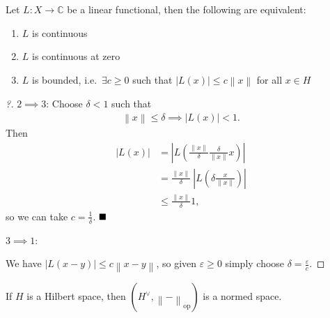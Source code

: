 \begin{theorem}

Let \(L:X \to {\mathbb{C}}\) be a linear functional, then the following
are equivalent:

\begin{enumerate}
\def\labelenumi{\arabic{enumi}.}
\tightlist
\item
  \(L\) is continuous
\item
  \(L\) is continuous at zero
\item
  \(L\) is bounded, i.e.~\(\exists c\geq 0\) such that
  \({\left\lvert {L(x)} \right\rvert} \leq c {\left\lVert {x} \right\rVert}\)
  for all \(x\in H\)
\end{enumerate}

\end{theorem}

\begin{proof}[?]

\(2 \implies 3\): Choose \(\delta < 1\) such that
\begin{align*}
{\left\lVert {x} \right\rVert} \leq \delta \implies {\left\lvert {L(x)} \right\rvert} < 1.
\end{align*}
Then
\begin{align*}
{\left\lvert {L(x)} \right\rvert} 
&= {\left\lvert {L\left( \frac{{\left\lVert {x} \right\rVert}}{\delta} \frac{\delta }{{\left\lVert {x} \right\rVert}} x \right)} \right\rvert} \\
&= \frac{{\left\lVert {x} \right\rVert}}{\delta} ~{\left\lvert {L\left( \delta \frac{x }{{\left\lVert {x} \right\rVert}} \right)} \right\rvert} \\
&\leq \frac{{\left\lVert {x} \right\rVert}}{\delta} 1
,\end{align*}
so we can take \(c = \frac 1 \delta\). \(\hfill\blacksquare\)

\(3 \implies 1\):

We have
\({\left\lvert {L(x-y)} \right\rvert} \leq c{\left\lVert {x-y} \right\rVert}\),
so given \(\varepsilon \geq 0\) simply choose
\(\delta = \frac \varepsilon c\).

\end{proof}

\begin{theorem}

If \(H\) is a Hilbert space, then
\((H {}^{ \vee }, {\left\lVert {{-}} \right\rVert}_{\text{op}})\) is a
normed space.

\end{theorem}

